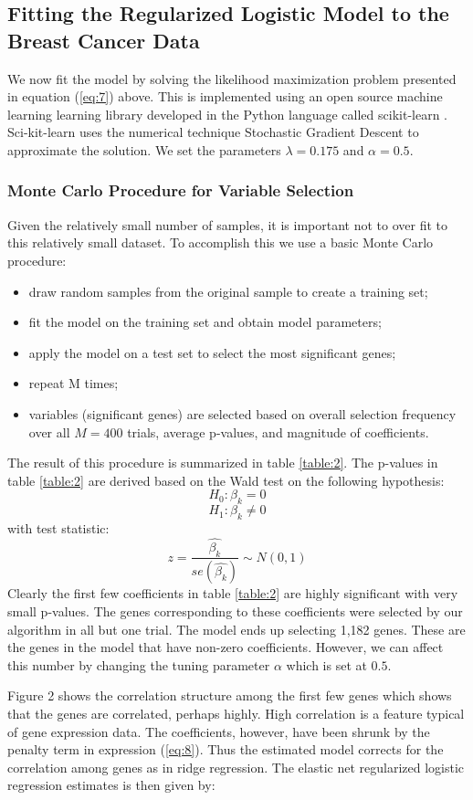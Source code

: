 \documentclass[12pt,a4paper]{article}
\begin{document}
\subsection{Fitting the Regularized Logistic Model to the Breast Cancer Data}
We now fit the model by solving the likelihood maximization problem presented in equation (\ref{eq:7}) above. This is implemented using an open source machine learning learning library developed in the Python language called scikit-learn \cite{scikit-learn}. Sci-kit-learn uses the numerical technique Stochastic Gradient Descent to approximate the solution. We set the parameters $\lambda = 0.175$ and $\alpha = 0.5$.
\subsubsection{Monte Carlo Procedure for Variable Selection} \label{section:mc}
Given the relatively small number of samples, it is important not to over fit to this relatively small dataset. To accomplish this we use a basic Monte Carlo procedure:
\begin{itemize}
\item draw random samples from the original sample to create a training set;
\item fit the model on the training set and obtain model parameters;
\item apply the model on a test set to select the most significant genes;
\item repeat M times;
\item variables (significant genes) are selected based on overall selection frequency over all $M = 400$ trials, average p-values, and magnitude of coefficients.
\end{itemize}
The result of this procedure is summarized in table \ref{table:2}. The p-values in table \ref{table:2} are derived based on the Wald test on the following hypothesis:
\[H_0: \beta_k = 0\]
\[H_1: \beta_k \neq 0\]
with test statistic:
\[z=\frac{\hat{\beta_k}}{se\left(\hat{\beta_k}\right)}\sim N\left(0,1\right)\]
Clearly the first few coefficients in table \ref{table:2} are highly significant with very small p-values. The genes corresponding to these coefficients were selected by our algorithm in all but one trial. The model ends up selecting 1,182 genes. These are the genes in the model that have non-zero coefficients. However, we can affect this number by changing the tuning parameter $\alpha$ which is set at $0.5$. \\
\par Figure 2 shows the correlation structure among the first few genes which shows that the genes are correlated, perhaps highly. High correlation is a feature typical of gene expression data. The coefficients, however, have been shrunk by the penalty term in expression (\ref{eq:8}). Thus the estimated model corrects for the correlation among genes as in ridge regression. The elastic net regularized logistic regression estimates is then given by:
\end{document}
